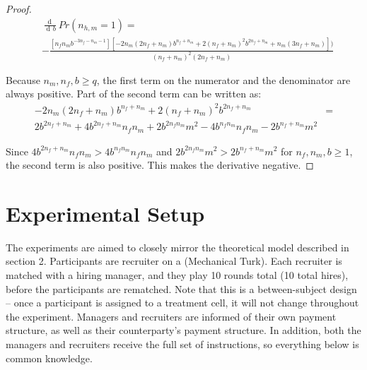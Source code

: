 \documentclass[11pt]{article}
\DeclareMathOperator{\di}{d\!}
\begin{document}
\begin{proof}
    \begin{align*}
         & \frac{\di}{\di b} Pr(n_{h,m}=1) =                                                                                                         \\
         & -\frac{[n_f n_m b^{-3 n_f-n_m-1}] [-2 n_m (2 n_f+n_m) b^{n_f+n_m}+2 (n_f+n_m)^2 b^{2 n_f+n_m}+n_m (3 n_f+n_m)])}{(n_f+n_m)^2 (2 n_f+n_m)}
    \end{align*}

    Because $n_m, n_f, b \geq q$, the first term on the numerator and the denominator are always positive. Part of the second term can be written as:
    \begin{align*}
        -2 n_m (2 n_f+n_m) b^{n_f+n_m}+2 (n_f+n_m)^2 b^{2 n_f+n_m} & = \\
        2b^{2n_f+n_m} + 4b^{2n_f+n_m} n_f n_m + 2b^{2n_fn_m} m^2 - 4b^{n_fn_m}n_fn_m - 2b^{n_f+n_m}m^2
    \end{align*}

    Since $4b^{2n_f+n_m} n_f n_m > 4b^{n_fn_m}n_fn_m$ and $2b^{2n_fn_m} m^2 > 2b^{n_f+n_m}m^2$ for $n_f,n_m,b \geq 1$, the second term is also positive. This makes the derivative negative.
\end{proof}

\section{Experimental Setup}

The experiments are aimed to closely mirror the theoretical model described in section 2. Participants are recruiter on a (Mechanical Turk). Each recruiter is matched with a hiring manager, and they play 10 rounds total (10 total hires), before the participants are rematched.  Note that this is a between-subject design -- once a participant is assigned to a treatment cell, it will not change throughout the experiment. Managers and recruiters are informed of their own payment structure, as well as their counterparty's payment structure. In addition, both the managers and recruiters receive the full set of instructions, so everything below is common knowledge. \\
\end{document}
